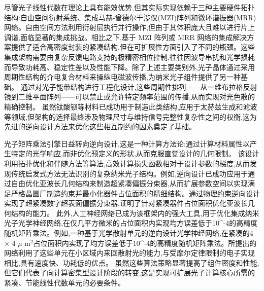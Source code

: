 \documentclass[11pt]{article}
\begin{document}
尽管光子线性代数在理论上具有能效优势,但其实际实现依赖于三种主要硬件拓扑结构:自由空间衍射系统、集成马赫-曾德尔干涉仪(MZI)阵列和微环谐振器(MRR)网络。自由空间方法利用衍射层执行并行操作,但由于其体积庞大且难以进行片上调谐,面临显著的集成挑战。相比之下,基于 MZI 阵列或 MRR 网络的集成解决方案提供了适合高密度封装的紧凑结构,但在可扩展性方面引入了不同的瓶颈。这些集成架构需要由复杂反馈电路支持的极精密相位控制,往往因波导串扰和光学损耗而导致功耗高、稳定性差以及性能下降。除了上述主要类别外,光子晶体通过采用周期性结构的介电复合材料来操纵电磁波传播,为纳米光子组件提供了另一种基础。\citep{doi_10_71465_gmssrj79_3a431fc8} \citep{doi_10_3390_axioms14060445_76ffad4a} 通过对光子能带结构进行工程化设计,这些周期性排列------从一维布拉格反射镜到二维平面阵列------可以禁止或允许特定频率范围的传播,从而实现对光色散的精确控制。\citep{doi_10_4302_plp_v17i4_1361_327bd6c2} \citep{doi_10_1149_ma2026_01231276mtgabs_21448056} 虽然钛酸钡等材料已成功用于制造此类结构,应用于太赫兹生成和滤波等领域,但架构的选择最终涉及物理尺寸与维持信号完整性复杂性之间的权衡,这为先进的逆向设计方法来优化这些相互制约的因素奠定了基础。\citep{doi_10_1088_1402_4896_ae8345_3b948559} \citep{doi_10_1002_adom_202001249_3b8c9743}

光子矩阵乘法引擎日益转向逆向设计,这是一种计算方法论:通过计算材料属性以产生特定的光学响应,而非优化预定义的形状,从而克服直觉设计的几何限制。\citep{doi_10_1364_oe_530479_45946046} \citep{doi_10_1117_12_2649964_b6e13b8f} 该设计利用拓扑优化和伴随方法等算法,高效计算损失函数相对于设计参数的梯度,从而发现传统启发式方法无法识别的复杂纳米光子结构。例如,逆向设计已成功应用于通过自由优化亚波长几何结构来制造超紧凑偏振分束器,从而扩展参数空间以实现满足严格晶圆厂制造约束并最小化器件占位面积的精细结构。通过物理约束逆向设计实现了超紧凑数字超表面偏振分束器,证明了针对紧凑器件占位面积优化亚波长几何结构的能力。\citep{doi_10_3390_app121910064_718c1a26} 此外,人工神经网络已成为该框架内的强大工具,用于优化集成纳米光子光学神经网络,在仅几平方微米的占位面积内实现均方误差低于10\^{}-4的高精度随机矩阵乘法。例如,一种基于光学散射单元的逆向设计光学神经网络,在紧凑的4 \(\times\) 4 \(\mu\) m\(^{2}\)占位面积内实现了均方误差低于10\^{}-4的高精度随机矩阵乘法。所提出的网络利用了这些单元在小区域内来回散射光的能力,与受摩尔定律限制的电子实现相比,具有速度快、功耗低的优点。\citep{doi_10_1016_j_scib_2020_03_042_6b632485} 虽然这些算法策略显著提高了组件密度和性能,但它们代表了向计算密集型设计阶段的转变,这是实现可扩展光子计算核心所需的紧凑、节能线性代数单元的必要条件。\citep{doi_10_1515_nanoph_2020_0379_1cc596ab} \citep{doi_10_3390_app121910064_718c1a26} \citep{doi_10_1016_j_scib_2020_03_042_6b632485}
\end{document}
